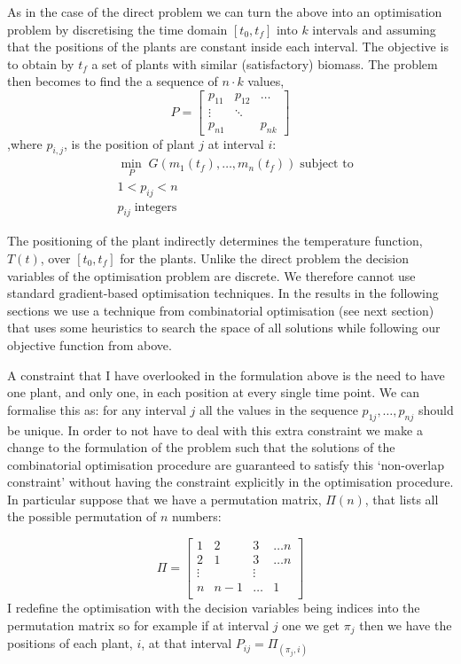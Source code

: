 As in the case of the direct problem we can turn the above into an optimisation
problem by discretising the time domain $[t_0, t_f]$ into $k$ intervals and
assuming that the positions of the plants are constant inside each interval. The
objective is to obtain by $t_f$ a set of plants with similar (satisfactory)
biomass. The problem then becomes to find the a sequence of $n \cdot k$ values,
$$
P = \begin{bmatrix} 
    p_{11} & p_{12} & \dots \\
    \vdots & \ddots & \\
    p_{n1} &        & p_{nk} 
    \end{bmatrix}
$$
,where $p_{i, j}$, is the position of plant $j$ at interval $i$:
\begin{align*}
& \min_{P} \; G(m_1(t_f), \dots, m_n(t_f)) \; \text{subject to} \\
& 1 < p_{ij} < n \\
& p_{ij} \; \text{integers}
\end{align*}

The positioning of the plant indirectly determines the temperature function,
$T(t)$, over $[t_0, t_f]$ for the plants. Unlike the direct problem the decision
variables of the optimisation problem are discrete. We therefore cannot use
standard gradient-based optimisation techniques. In the results in the following
sections we use a technique from combinatorial optimisation (see next section)
that uses some heuristics to search the space of all solutions while following
our objective function from above.

A constraint that I have overlooked in the formulation above is the need to
have one plant, and only one, in each position at every single time point. We
can formalise this as: for any interval $j$ all the values in the sequence
$p_{1j}, \dots, p_{nj}$ should be unique. In order to not have to deal with this
extra constraint we make a change to the formulation of the problem such that
the solutions of the combinatorial optimisation procedure are guaranteed to
satisfy this `non-overlap constraint' without having the constraint explicitly
in the optimisation procedure. In particular suppose that we have a permutation
matrix, $\Pi(n)$, that lists all the possible permutation of $n$ numbers:

$$
\Pi = \begin{bmatrix} 
    1 & 2 & 3 & \dots n \\
    2 & 1 & 3 & \dots n \\
    \vdots &  & \vdots \\
    n &  n-1 & \dots  &  1 \\
    \end{bmatrix}
$$
I redefine the optimisation with the decision variables being indices into the
permutation matrix so for example if at interval $j$ one we get $\pi_j$ then we
have the positions of each plant, $i$, at that interval $P_{ij} = \Pi_{(\pi_j, i)}$

